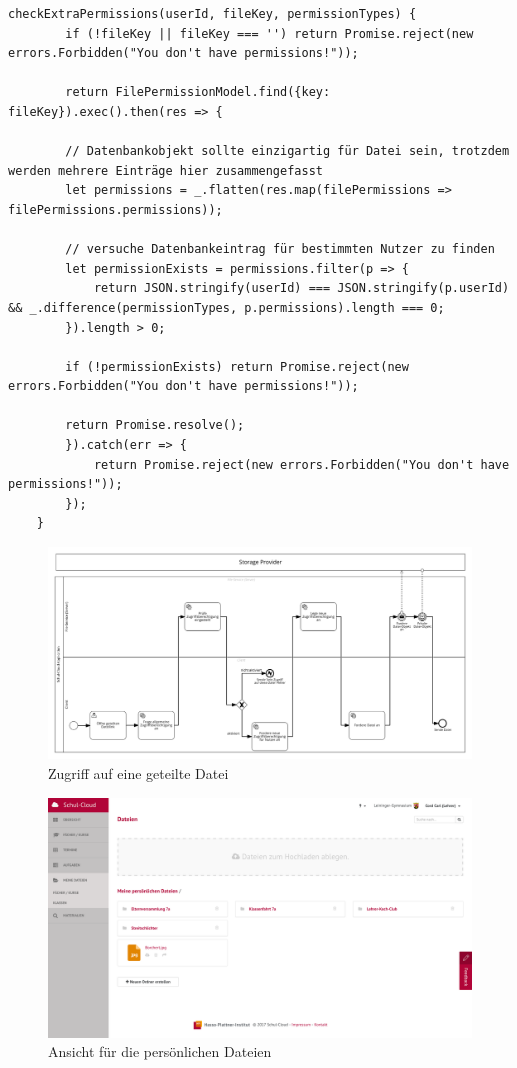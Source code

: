\begin{lstlisting}[caption=checkExtraPermissions() Funktion des filePermissionHelper, label=code:fphextra]
	checkExtraPermissions(userId, fileKey, permissionTypes) {
		if (!fileKey || fileKey === '') return Promise.reject(new errors.Forbidden("You don't have permissions!"));
	
		return FilePermissionModel.find({key: fileKey}).exec().then(res => {
		
		// Datenbankobjekt sollte einzigartig für Datei sein, trotzdem werden mehrere Einträge hier zusammengefasst
		let permissions = _.flatten(res.map(filePermissions => filePermissions.permissions));
	
		// versuche Datenbankeintrag für bestimmten Nutzer zu finden
		let permissionExists = permissions.filter(p => {
			return JSON.stringify(userId) === JSON.stringify(p.userId) && _.difference(permissionTypes, p.permissions).length === 0;
		}).length > 0;
	
		if (!permissionExists) return Promise.reject(new errors.Forbidden("You don't have permissions!"));
	
		return Promise.resolve();
		}).catch(err => {
			return Promise.reject(new errors.Forbidden("You don't have permissions!"));
		});
	}
\end{lstlisting}

\begin{figure}[H]
	\includegraphics[width=1.5\linewidth, angle=270]{images/filesharingusing}
	\caption[Caption for concept]{Zugriff auf eine geteilte Datei}
	\centering
	\label{fig:filesharingusing}
\end{figure}

\begin{figure}[H]
	\centering
	\includegraphics[width=1\linewidth]{images/screenMeineDateien}
	\caption{Ansicht für die persönlichen Dateien}
	\label{fig:screenMeineDateien}
\end{figure}

